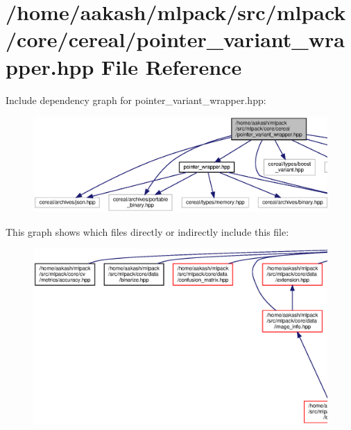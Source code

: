 \section{/home/aakash/mlpack/src/mlpack/core/cereal/pointer\+\_\+variant\+\_\+wrapper.hpp File Reference}
\label{pointer__variant__wrapper_8hpp}
Include dependency graph for pointer\+\_\+variant\+\_\+wrapper.\+hpp\+:
\nopagebreak
\begin{figure}[H]
\begin{center}
\leavevmode
\includegraphics[width=350pt]{pointer__variant__wrapper_8hpp__incl}
\end{center}
\end{figure}
This graph shows which files directly or indirectly include this file\+:
\nopagebreak
\begin{figure}[H]
\begin{center}
\leavevmode
\includegraphics[width=350pt]{pointer__variant__wrapper_8hpp__dep__incl}
\end{center}
\end{figure}
